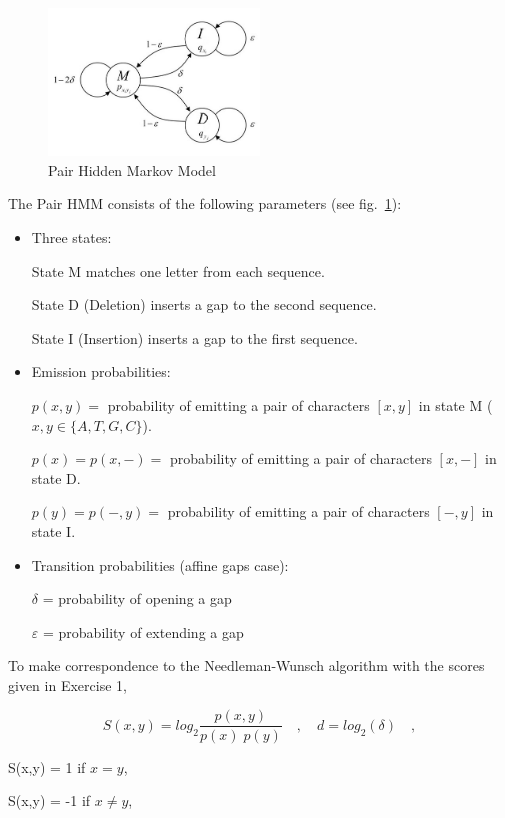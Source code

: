 \documentclass[a4paper,11pt]{article}
\begin{document}
\begin{figure}[h]
\begin{center}
\includegraphics[width=0.5\textwidth]{HMM.jpg}
\caption{Pair Hidden Markov Model}
\label{fig:HMM}
\end{center}
\end{figure}


The Pair HMM consists of the following parameters (see fig.~\ref{fig:HMM}):

\begin{itemize}
\item Three states:

State M matches one letter from each sequence.

State D (Deletion) inserts a gap to the second sequence.

State I (Insertion) inserts a gap to the first sequence.

\item Emission probabilities:

$p(x,y) =$ probability of emitting a pair of characters $[x,y]$ in state M ($x,y \in \{A,T,G,C\}$).

$p(x) = p(x,-) =$ probability of emitting a pair of characters $[x,-]$ in state D.

$p(y) = p(-,y) =$ probability of emitting a pair of characters $[-,y]$ in state I.

\item Transition probabilities (affine gaps case):

$\delta$ = probability of opening a gap

$\varepsilon$ = probability of extending a gap
\end{itemize}

To make correspondence to the Needleman-Wunsch algorithm with the scores given in Exercise 1,


$$S(x,y)=log_2\frac{p(x,y)}{p(x)\; p(y)} \quad , \quad d=log_2(\delta) \quad ,$$

S(x,y) = 1 if $x=y$, 

S(x,y) = -1 if $x\neq y$,
\end{document}

